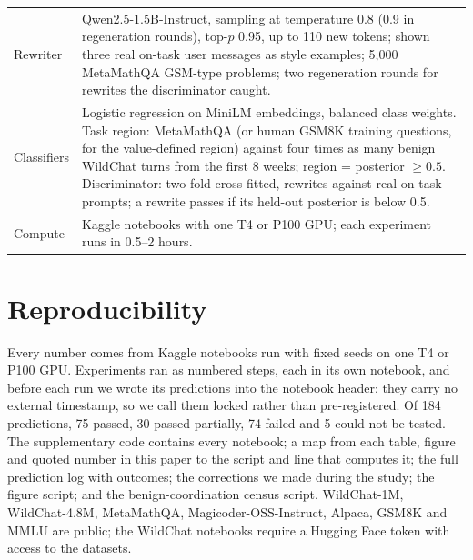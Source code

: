 \begin{table}[ht]
\begin{tabular}{p{}p{}}
Rewriter & Qwen2.5-1.5B-Instruct, sampling at temperature 0.8 (0.9 in regeneration rounds), top-$p$ 0.95, up to 110 new tokens; shown three real on-task user messages as style examples; 5{,}000 MetaMathQA GSM-type problems; two regeneration rounds for rewrites the discriminator caught. \\
Classifiers & Logistic regression on MiniLM embeddings, balanced class weights. Task region: MetaMathQA (or human GSM8K training questions, for the value-defined region) against four times as many benign WildChat turns from the first 8 weeks; region = posterior $\ge0.5$. Discriminator: two-fold cross-fitted, rewrites against real on-task prompts; a rewrite passes if its held-out posterior is below 0.5. \\
Compute & Kaggle notebooks with one T4 or P100 GPU; each experiment runs in 0.5--2 hours. \\
\bottomrule
\end{tabular}
\end{table}

\FloatBarrier
\section{Reproducibility}
\label{app:repro}

Every number comes from Kaggle notebooks run with fixed seeds on one T4 or P100 GPU. Experiments ran as numbered steps, each in its own notebook, and before each run we wrote its predictions into the notebook header; they carry no external timestamp, so we call them locked rather than pre-registered. Of 184 predictions, 75 passed, 30 passed partially, 74 failed and 5 could not be tested. The supplementary code contains every notebook; a map from each table, figure and quoted number in this paper to the script and line that computes it; the full prediction log with outcomes; the corrections we made during the study; the figure script; and the benign-coordination census script. WildChat-1M, WildChat-4.8M, MetaMathQA, Magicoder-OSS-Instruct, Alpaca, GSM8K and MMLU are public; the WildChat notebooks require a Hugging Face token with access to the datasets.
